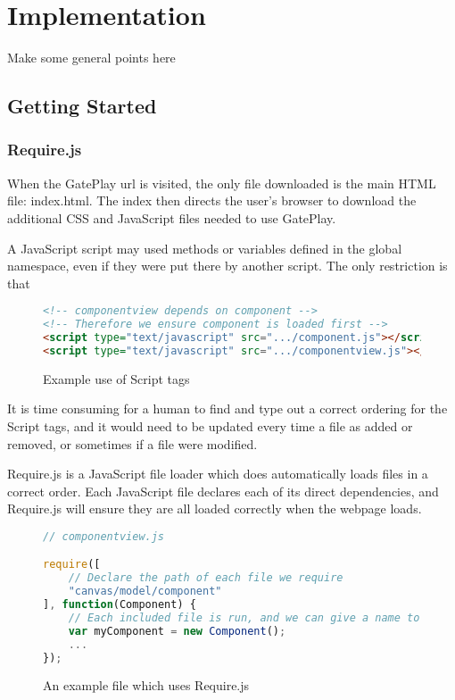 \chapter{Implementation}
Make some general points here

\section{Getting Started}

\subsection{Require.js}
When the GatePlay url is visited, the only file downloaded is the main HTML file: index.html. The index then directs the user's browser to download the additional CSS and JavaScript files needed to use GatePlay.

A JavaScript script may used methods or variables defined in the global namespace, even if they were put there by another script. The only restriction is that

\begin{figure}[H]
\begin{lstlisting}[language=html]
<!-- componentview depends on component -->
<!-- Therefore we ensure component is loaded first -->
<script type="text/javascript" src=".../component.js"></script>
<script type="text/javascript" src=".../componentview.js"></script>
\end{lstlisting}
\caption{Example use of Script tags}
\end{figure}

It is time consuming for a human to find and type out a correct ordering for the Script tags, and it would need to be updated every time a file as added or removed, or sometimes if a file were modified.

Require.js is a JavaScript file loader which does automatically loads files in a correct order. Each JavaScript file declares each of its direct dependencies, and Require.js will ensure they are all loaded correctly when the webpage loads.

\begin{figure}[H]
\begin{lstlisting}[language=JavaScript]
// componentview.js

require([
	// Declare the path of each file we require	
	"canvas/model/component"
], function(Component) {
	// Each included file is run, and we can give a name to whatever it returns if desired
	var myComponent = new Component();
	...
});
\end{lstlisting}
\caption{An example file which uses Require.js}
\end{figure}

